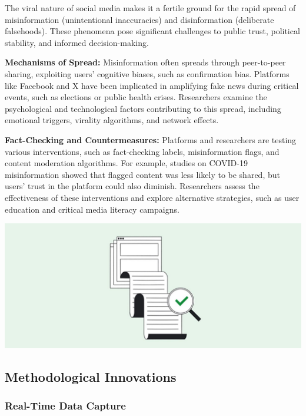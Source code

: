 \documentclass[
]{book}
\begin{document}
The viral nature of social media makes it a fertile ground for the rapid spread of misinformation (unintentional inaccuracies) and disinformation (deliberate falsehoods). These phenomena pose significant challenges to public trust, political stability, and informed decision-making.

\textbf{Mechanisms of Spread:} Misinformation often spreads through peer-to-peer sharing, exploiting users' cognitive biases, such as confirmation bias. Platforms like Facebook and X have been implicated in amplifying fake news during critical events, such as elections or public health crises. Researchers examine the psychological and technological factors contributing to this spread, including emotional triggers, virality algorithms, and network effects.

\textbf{Fact-Checking and Countermeasures:} Platforms and researchers are testing various interventions, such as fact-checking labels, misinformation flags, and content moderation algorithms. For example, studies on COVID-19 misinformation showed that flagged content was less likely to be shared, but users' trust in the platform could also diminish. Researchers assess the effectiveness of these interventions and explore alternative strategies, such as user education and critical media literacy campaigns.

\href{https://newsinitiative.withgoogle.com/resources/trainings/verification/google-fact-check-tools/}{\includegraphics[width=1\textwidth,height=\textheight]{images/factcheck.jpg}}

\subsection{Methodological Innovations}\label{methodological-innovations}

\subsubsection{Real-Time Data Capture}\label{real-time-data-capture}
\end{document}
